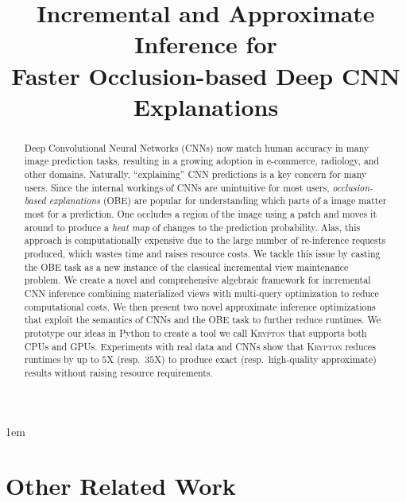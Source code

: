\documentclass[10pt, sigconf]{acmart}
\begin{document}
\emergencystretch 1em

\title{Incremental and Approximate Inference for\\Faster Occlusion-based Deep CNN Explanations}



\begin{abstract}
Deep Convolutional Neural Networks (CNNs) now match human accuracy in many image prediction tasks, resulting in a growing adoption in e-commerce, radiology, and other domains. Naturally, ``explaining'' CNN predictions is a key concern for many users. Since the internal workings of CNNs are unintuitive for most users, \textit{occlusion-based explanations} (OBE) are popular for understanding which parts of a image matter most for a prediction. One occludes a region of the image using a patch and moves it around to produce a \textit{heat map} of changes to the prediction probability. Alas, this approach is computationally expensive due to the large number of re-inference requests produced, which wastes time and raises resource costs. We tackle this issue by casting the OBE task as a new instance of the classical incremental view maintenance problem. We create a novel and comprehensive algebraic framework for incremental CNN inference combining materialized views with multi-query optimization to reduce computational costs. We then present two novel approximate inference optimizations that exploit the semantics of CNNs and the OBE task to further reduce runtimes. We prototype our ideas in Python to create a tool we call \textsc{Krypton} that supports both CPUs and GPUs. Experiments with real data and CNNs show that \textsc{Krypton} reduces runtimes by up to $5$X (resp.~$35$X) to produce exact (resp.~high-quality approximate) results without raising resource requirements.
\end{abstract}

\maketitle



% 







\section{Other Related Work}
\end{document}
